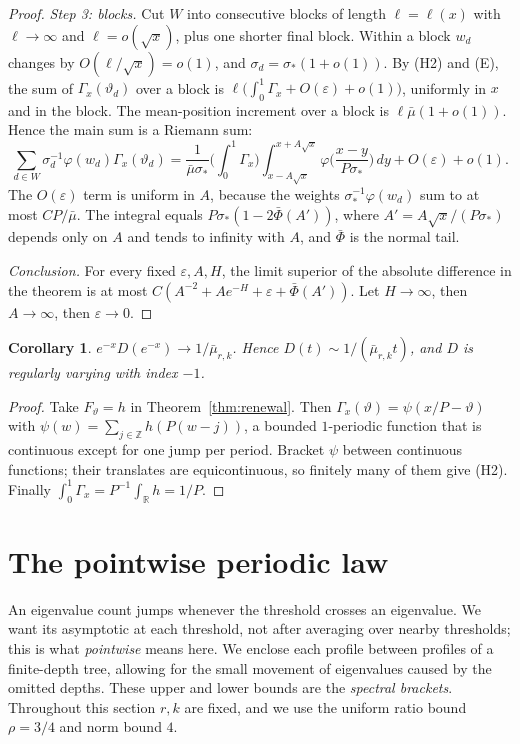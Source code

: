 \documentclass[11pt]{article}
\newtheorem{corollary}[theorem]{Corollary}
\theoremstyle{definition}
\theoremstyle{remark}
\newcommand{\Z}{\mathbb Z}
\newcommand{\R}{\mathbb R}
\begin{document}
\begin{proof}
\emph{Step 3: blocks.} Cut $W$ into consecutive blocks of length
$\ell=\ell(x)$ with $\ell\to\infty$ and $\ell=o(\sqrt x)$, plus one shorter
final block. Within a block $w_d$ changes by $O(\ell/\sqrt x)=o(1)$, and
$\sigma_d=\sigma_*(1+o(1))$. By (H2) and (E), the sum of $\Gamma_x(\vartheta_d)$
over a block is $\ell\big(\int_0^1\Gamma_x+O(\varepsilon)+o(1)\big)$,
uniformly in $x$ and in the block. The mean-position increment over a block is
$\ell\bar\mu(1+o(1))$. Hence the main sum is a Riemann sum:
\[
 \sum_{d\in W}\sigma_d^{-1}\varphi(w_d)\Gamma_x(\vartheta_d)
 =\frac1{\bar\mu\sigma_*}\Big(\int_0^1\Gamma_x\Big)
 \int_{x-A\sqrt x}^{x+A\sqrt x}\varphi\Big(\frac{x-y}{P\sigma_*}\Big)\,dy
 +O(\varepsilon)+o(1).
\]
The $O(\varepsilon)$ term is uniform in $A$, because the weights
$\sigma_*^{-1}\varphi(w_d)$ sum to at most $CP/\bar\mu$. The integral equals
$P\sigma_*(1-2\bar\Phi(A'))$, where $A'=A\sqrt x/(P\sigma_*)$ depends only
on $A$ and tends to infinity with $A$, and $\bar\Phi$ is the normal tail.

\emph{Conclusion.} For every fixed $\varepsilon,A,H$, the limit superior of
the absolute difference in the theorem is at most
$C(A^{-2}+Ae^{-H}+\varepsilon+\bar\Phi(A'))$. Let $H\to\infty$, then
$A\to\infty$, then $\varepsilon\to0$.
\end{proof}

\begin{corollary}\label{cor:D}
$e^{-x}D(e^{-x})\to1/\bar\mu_{r,k}$. Hence $D(t)\sim1/(\bar\mu_{r,k}t)$, and $D$ is
regularly varying with index $-1$.
\end{corollary}
\begin{proof}
Take $F_\vartheta=h$ in Theorem~\ref{thm:renewal}. Then
$\Gamma_x(\vartheta)=\psi(x/P-\vartheta)$ with
$\psi(w)=\sum_{j\in\Z}h(P(w-j))$, a bounded $1$-periodic function that is
continuous except for one jump per period. Bracket $\psi$ between continuous
functions; their translates are equicontinuous, so finitely many of them
give (H2). Finally $\int_0^1\Gamma_x=P^{-1}\int_\R h=1/P$.
\end{proof}

\section{The pointwise periodic law}\label{sec:criterion}

An eigenvalue count jumps whenever the threshold crosses an eigenvalue.
We want its asymptotic at each threshold, not after averaging over
nearby thresholds; this is what \emph{pointwise} means here. We enclose
each profile between profiles of a finite-depth tree, allowing for the
small movement of eigenvalues caused by the omitted depths. These upper
and lower bounds are the \emph{spectral brackets}.
Throughout this section $r,k$ are fixed, and we use the uniform ratio
bound $\rho=3/4$ and norm bound $4$.
\end{document}
